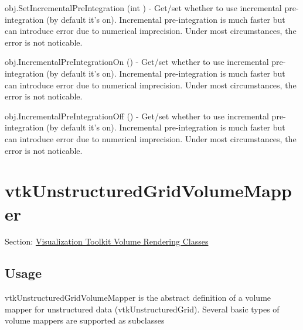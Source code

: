 \begin{DoxyItemize}
\item {\ttfamily obj.\-Set\-Incremental\-Pre\-Integration (int )} -\/ Get/set whether to use incremental pre-\/integration (by default it's on). Incremental pre-\/integration is much faster but can introduce error due to numerical imprecision. Under most circumstances, the error is not noticable.  
\item {\ttfamily obj.\-Incremental\-Pre\-Integration\-On ()} -\/ Get/set whether to use incremental pre-\/integration (by default it's on). Incremental pre-\/integration is much faster but can introduce error due to numerical imprecision. Under most circumstances, the error is not noticable.  
\item {\ttfamily obj.\-Incremental\-Pre\-Integration\-Off ()} -\/ Get/set whether to use incremental pre-\/integration (by default it's on). Incremental pre-\/integration is much faster but can introduce error due to numerical imprecision. Under most circumstances, the error is not noticable.  
\end{DoxyItemize}\hypertarget{vtkvolumerendering_vtkunstructuredgridvolumemapper}{}\section{vtk\-Unstructured\-Grid\-Volume\-Mapper}\label{vtkvolumerendering_vtkunstructuredgridvolumemapper}
Section\-: \hyperlink{sec_vtkvolumerendering}{Visualization Toolkit Volume Rendering Classes} \hypertarget{vtkwidgets_vtkxyplotwidget_Usage}{}\subsection{Usage}\label{vtkwidgets_vtkxyplotwidget_Usage}
vtk\-Unstructured\-Grid\-Volume\-Mapper is the abstract definition of a volume mapper for unstructured data (vtk\-Unstructured\-Grid). Several basic types of volume mappers are supported as subclasses

